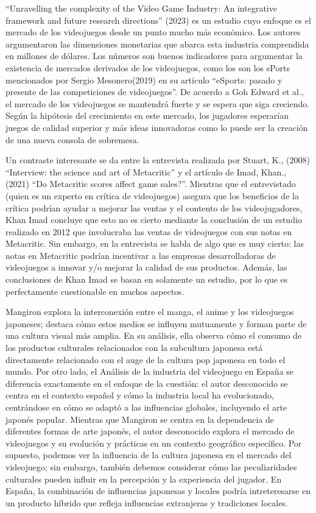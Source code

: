 \documentclass[
  letterpaper,
  DIV=11,
  numbers=noendperiod]{scrreprt}
\begin{document}
``Unravelling the complexity of the Video Game Industry: An integrative
framework and future research directions'' (2023) es un estudio cuyo
enfoque es el mercado de los videojuegos desde un punto mucho más
económico. Los autores argumentaron las dimensiones monetarias que
abarca esta industria comprendida en millones de dólares. Los números
son buenos indicadores para argumentar la existencia de mercados
derivados de los videojuegos, como los son los sPorts mencionados por
Sergio Mesonero(2019) en su artículo ``eSports: pasado y presente de las
competiciones de videojuegos''. De acuerdo a Goh Edward et al., el
mercado de los videojuegos se mantendrá fuerte y se espera que siga
creciendo. Según la hipótesis del crecimiento en este mercado, los
jugadores esperarían juegos de calidad superior y más ideas innovadoras
como lo puede ser la creación de una nueva consola de sobremesa.

Un contraste interesante se da entre la entrevista realizada por Stuart,
K., (2008) ``Interview: the science and art of Metacritic'' y el
artículo de Imad, Khan., (2021) ``Do Metacritic scores affect game
sales?''. Mientras que el entrevistado (quien es un experto en crítica
de videojuegos) asegura que los beneficios de la crítica podrían ayudar
a mejorar las ventas y el contento de los videojugadores, Khan Imad
concluye que esto no es cierto mediante la conclusión de un estudio
realizado en 2012 que involucraba las ventas de videojuegos con sus
notas en Metacritic. Sin embargo, en la entrevista se habla de algo que
es muy cierto: las notas en Metacritic podrían incentivar a las empresas
desarrolladoras de videojuegos a innovar y/o mejorar la calidad de sus
productos. Además, las conclusiones de Khan Imad se basan en solamente
un estudio, por lo que es perfectamente cuestionable en muchos aspectos.

Mangiron explora la interconexión entre el manga, el anime y los
videojuegos japoneses; destaca cómo estos medios se influyen mutuamente
y forman parte de una cultura visual más amplia. En su análisis, ella
observa cómo el consumo de los productos culturales relacionados con la
subcultura japonesa está directamente relacionado con el auge de la
cultura pop japonesa en todo el mundo. Por otro lado, el Análisis de la
industria del videojuego en España se diferencia exactamente en el
enfoque de la cuestión: el autor desconocido se centra en el contexto
español y cómo la industria local ha evolucionado, centrándose en cómo
se adaptó a las influencias globales, incluyendo el arte japonés
popular. Mientras que Mangiron se centra en la dependencia de diferentes
formas de arte japonés, el autor desconocido explora el mercado de
videojuegos y su evolución y prácticas en un contexto geográfico
específico. Por supuesto, podemos ver la influencia de la cultura
japonesa en el mercado del videojuego; sin embargo, también debemos
considerar cómo las peculiaridades culturales pueden influir en la
percepción y la experiencia del jugador. En España, la combinación de
influencias japonesas y locales podría intreteresarse en un producto
híbrido que refleja influencias extranjeras y tradiciones locales.
\end{document}
